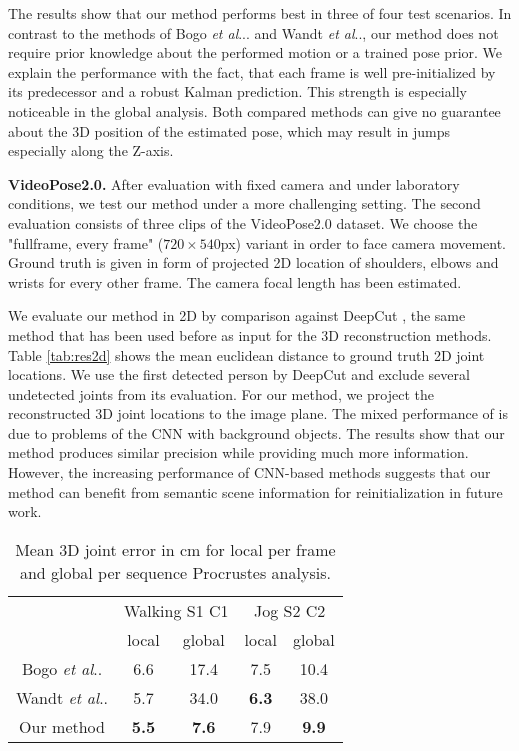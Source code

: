 \documentclass[10pt,twocolumn,letterpaper]{article}
\makeatletter
\DeclareRobustCommand\onedot{\futurelet\@let@token\@onedot}
\def\@onedot{\ifx\@let@token.\else.\null\fi\xspace}
\def\etal{\emph{et al}\onedot}
\makeatother
\begin{document}
The results show that our method performs best in three of four test scenarios. In contrast to the methods of Bogo \etal. \cite{bogo2016smplify} and Wandt \etal \cite{wandt20163d}, our method does not require prior knowledge about the performed motion or a trained pose prior. We explain the performance with the fact, that each frame is well pre-initialized by its predecessor and a robust Kalman prediction. This strength is especially noticeable in the global analysis. Both compared methods can give no guarantee about the 3D position of the estimated pose, which may result in jumps especially along the Z-axis.


\textbf{VideoPose2.0.} After evaluation with fixed camera and under laboratory conditions, we test our method under a more challenging setting. The second evaluation consists of three clips of the VideoPose2.0 dataset. We choose the "fullframe, every frame" ($720 \times 540$px) variant in order to face camera movement. Ground truth is given in form of projected 2D location of shoulders, elbows and wrists for every other frame. The camera focal length has been estimated.

We evaluate our method in 2D by comparison against DeepCut \cite{deepcut16cvpr}, the same method that has been used before as input for the 3D reconstruction methods. %
Table \ref{tab:res2d} shows the mean euclidean distance to ground truth 2D joint locations. We use the first detected person by DeepCut and exclude several undetected joints from its evaluation. For our method, we project the reconstructed 3D joint locations to the image plane. The mixed performance of \cite{deepcut16cvpr} is due to problems of the CNN with background objects. The results show that our method produces similar precision while providing much more information. However, the increasing performance of CNN-based methods suggests that our method can benefit from semantic scene information for reinitialization in future work.


\begin{table}[t]
	\begin{center}
		\caption{Mean 3D joint error in cm for local per frame and global per sequence Procrustes analysis.}
		\label{tab:res3d}
		\begin{tabular}{ccccc}
			\hline 
			& \multicolumn{2}{c}{Walking S1 C1} & \multicolumn{2}{c}{Jog S2 C2}  \\ 
			& local & global & local & global \\ 
			\hline 
			Bogo \etal \cite{bogo2016smplify} & 6.6  & 17.4 & 7.5 & 10.4  \\ 
			Wandt \etal \cite{wandt20163d} & 5.7 & 34.0 & \textbf{6.3} & 38.0 \\ 
			Our method & \textbf{5.5}  & \textbf{7.6} & 7.9 & \textbf{9.9} \\
			\hline 
		\end{tabular}
	\end{center}
\end{table}
\end{document}
